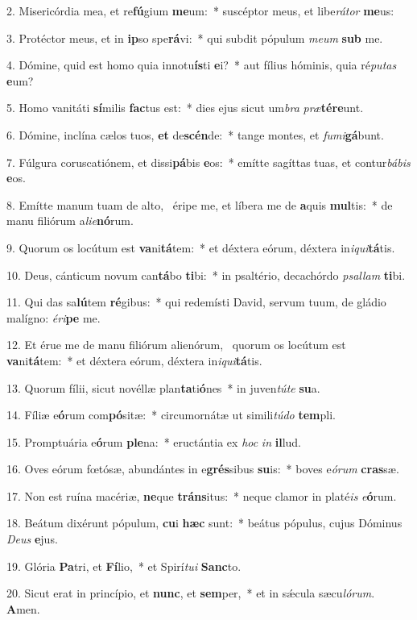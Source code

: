 2. Misericórdia mea, et re\textbf{fú}gium \textbf{me}um:~*  suscéptor meus, et libe\textit{rá}\textit{tor} \textbf{me}us:\

3. Protéctor meus, et in \textbf{ip}so spe\textbf{rá}vi:~*  qui subdit pópulum \textit{me}\textit{um} \textbf{sub} me.\

4. Dómine, quid est homo quia innotu\textbf{ís}ti \textbf{e}i?~*  aut fílius hóminis, quia ré\textit{pu}\textit{tas} \textbf{e}um?\

5. Homo vanitáti \textbf{sí}milis \textbf{fac}tus est:~*  dies ejus sicut um\textit{bra} \textit{præ}\textbf{tér}\textbf{e}unt.\

6. Dómine, inclína cælos tuos, \textbf{et} de\textbf{scén}de:~*  tange montes, et \textit{fu}\textit{mi}\textbf{gá}bunt.\

7. Fúlgura coruscatiónem, et dissi\textbf{pá}bis \textbf{e}os:~*  emítte sagíttas tuas, et contur\textit{bá}\textit{bis} \textbf{e}os.\

8. Emítte manum tuam de alto, \dag\  éripe me, et líbera me de \textbf{a}quis \textbf{mul}tis:~*  de manu filiórum a\textit{li}\textit{e}\textbf{nó}rum.\

9. Quorum os locútum est \textbf{va}ni\textbf{tá}tem:~*  et déxtera eórum, déxtera in\textit{i}\textit{qui}\textbf{tá}tis.\

10. Deus, cánticum novum can\textbf{tá}bo \textbf{ti}bi:~*  in psaltério, decachórdo \textit{psal}\textit{lam} \textbf{ti}bi.\

11. Qui das sa\textbf{lú}tem \textbf{ré}gibus:~*  qui redemísti David, servum tuum, de gládio malígno: \textit{é}\textit{ri}\textbf{pe} me.\

12. Et érue me de manu filiórum alienórum, \dag\  quorum os locútum est \textbf{va}ni\textbf{tá}tem:~*  et déxtera eórum, déxtera in\textit{i}\textit{qui}\textbf{tá}tis.\

13. Quorum fílii, sicut novéllæ plan\textbf{ta}ti\textbf{ó}nes~*  in juven\textit{tú}\textit{te} \textbf{su}a.\

14. Fíliæ e\textbf{ó}rum com\textbf{pó}sitæ:~*  circumornátæ ut simili\textit{tú}\textit{do} \textbf{tem}pli.\

15. Promptuária e\textbf{ó}rum \textbf{ple}na:~*  eructántia ex \textit{hoc} \textit{in} \textbf{il}lud.\

16. Oves eórum fœtósæ, abundántes in e\textbf{grés}sibus \textbf{su}is:~*  boves e\textit{ó}\textit{rum} \textbf{cras}sæ.\

17. Non est ruína macériæ, \textbf{ne}que \textbf{tráns}itus:~*  neque clamor in platé\textit{is} \textit{e}\textbf{ó}rum.\

18. Beátum dixérunt pópulum, \textbf{cu}i \textbf{hæc} sunt:~*  beátus pópulus, cujus Dóminus \textit{De}\textit{us} \textbf{e}jus.\

19. Glória \textbf{Pa}tri, et \textbf{Fí}lio,~*  et Spirí\textit{tu}\textit{i} \textbf{Sanc}to.\

20. Sicut erat in princípio, et \textbf{nunc}, et \textbf{sem}per,~*  et in sǽcula sæcu\textit{ló}\textit{rum}. \textbf{A}men.\

